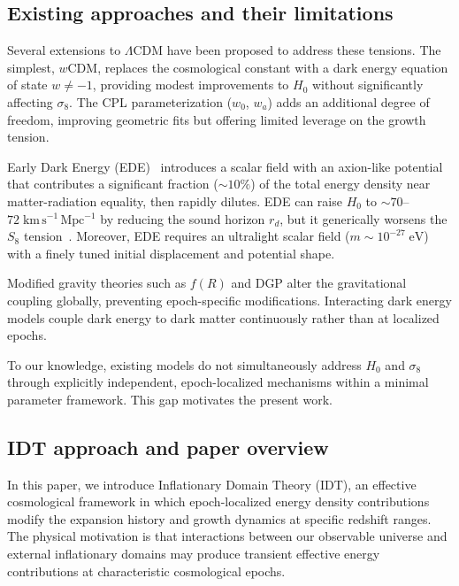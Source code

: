 \documentclass[aps,prd,twocolumn,superscriptaddress,nofootinbib]{revtex4-2}
\begin{document}
\subsection{Existing approaches and their limitations}

Several extensions to $\Lambda$CDM have been proposed to address these 
tensions. The simplest, $w$CDM, replaces the cosmological constant with a 
dark energy equation of state $w \neq -1$, providing modest improvements 
to $H_0$ without significantly affecting $\sigma_8$. The CPL 
parameterization ($w_0$, $w_a$) adds an additional degree of freedom, 
improving geometric fits but offering limited leverage on the growth 
tension.

Early Dark Energy (EDE)~\cite{Poulin2019,Smith2020} introduces a scalar 
field with an axion-like potential that contributes a significant fraction 
($\sim 10\%$) of the total energy density near matter-radiation equality, 
then rapidly dilutes. EDE can raise $H_0$ to $\sim 70$--$72\;\mathrm{
km\,s^{-1}\,Mpc^{-1}}$ by reducing the sound horizon $r_d$, but it 
generically worsens the $S_8$ tension~\cite{Hill2020,Ivanov2020}. 
Moreover, EDE requires an ultralight scalar field ($m \sim 10^{-27}\;
\mathrm{eV}$) with a finely tuned initial displacement and potential 
shape.

Modified gravity theories such as $f(R)$ and DGP alter the gravitational 
coupling globally, preventing epoch-specific modifications. Interacting 
dark energy models couple dark energy to dark matter continuously rather 
than at localized epochs.

To our knowledge, existing models do not simultaneously address $H_0$ and 
$\sigma_8$ through explicitly independent, epoch-localized mechanisms 
within a minimal parameter framework. This gap motivates the present work.

\subsection{IDT approach and paper overview}

In this paper, we introduce Inflationary Domain Theory (IDT), an effective 
cosmological framework in which epoch-localized energy density 
contributions modify the expansion history and growth dynamics at specific 
redshift ranges. The physical motivation is that interactions between our 
observable universe and external inflationary domains may produce transient 
effective energy contributions at characteristic cosmological epochs.
\end{document}
